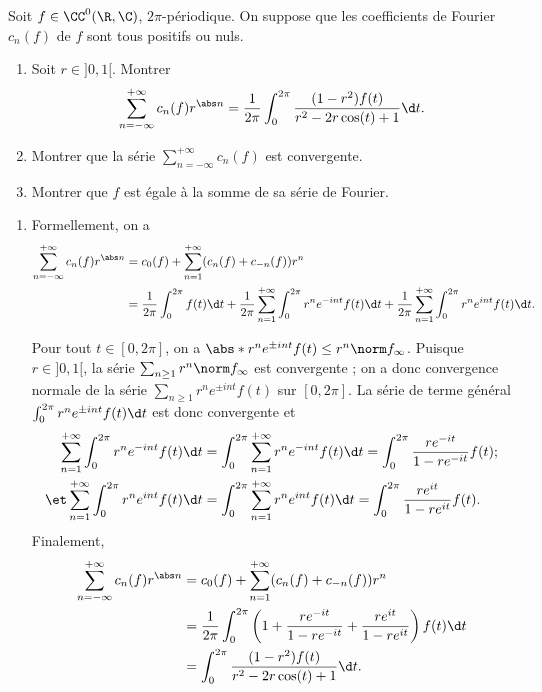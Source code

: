 \begin{enonce}
\begin{exercise}[ID={RMS121/2 E578, Mines-Ponts PSI},subtitle={},tags={}, difficulty={0}]
Soit $f\in\CC^0(\R,\C)$, $2\pi$-périodique. On suppose que les coefficients de Fourier $c_n(f)$ de $f$ sont tous positifs ou nuls.
\begin{enumerate}
\item Soit $r\in]0,1[$. Montrer
\begin{equation*}
    \sum_{n=-\infty}^{+\infty} c_n(f) r^{\abs n} 
    = \frac1{2\pi}\int_0^{2\pi} \frac{(1-r^2)f(t)}{r^2-2r\cos(t)+1}\d t.
\end{equation*}
\item Montrer que la série $\sum_{n=-\infty}^{+\infty} c_n(f)$ est convergente.
\item Montrer que $f$ est égale à la somme de sa série de Fourier.
\end{enumerate}
\end{exercise}
\begin{solution}
\begin{enumerate}
\item Formellement, on a
\begin{align*}
\sum_{n=-\infty}^{+\infty} c_n(f) r^{\abs n}
&= c_0(f) + \sum_{n=1}^{+\infty} (c_n(f)+c_{-n}(f)) r^n\\
&= \frac1{2\pi}\int_0^{2\pi} f(t)\d t
+\frac1{2\pi}\sum_{n=1}^{+\infty} \int_0^{2\pi} r^n e^{-int}f(t)\d t
+\frac1{2\pi}\sum_{n=1}^{+\infty} \int_0^{2\pi} r^n e^{int}f(t)\d t.
\end{align*}


Pour tout $t\in[0,2\pi]$, on a $\abs*{r^n e^{\pm int} f(t)}\leq r^n\norm f_\infty$.
Puisque $r\in]0,1[$, la série $\sum_{n\geq 1}  r^n\norm f_\infty$ est convergente ;
on a donc convergence normale de la série  $\sum_{n\geq 1} r^n e^{\pm int} f(t)$ sur $[0,2\pi]$.
La série de terme général $\int_0^{2\pi} r^ne^{\pm int}f(t)\d t$ est donc convergente et
\begin{align*}
    \sum_{n=1}^{+\infty} \int_0^{2\pi}r^n e^{-int}f(t)\d t 
    &= 
    \int_0^{2\pi} \sum_{n=1}^{+\infty} r^n e^{-int}f(t)\d t 
    = 
    \int_0^{2\pi}\frac{r e^{-it}}{1-re^{-it}}f(t) ;\\
\et \sum_{n=1}^{+\infty} \int_0^{2\pi}r^n e^{int}f(t)\d t 
    &= 
    \int_0^{2\pi} \sum_{n=1}^{+\infty} r^n e^{int}f(t)\d t 
    = 
    \int_0^{2\pi}\frac{r e^{it}}{1-re^{it}}f(t).
\end{align*}
Finalement,
\begin{align*}
\sum_{n=-\infty}^{+\infty} c_n(f) r^{\abs n}
&= c_0(f) + \sum_{n=1}^{+\infty} (c_n(f)+c_{-n}(f)) r^n\\
&= \frac1{2\pi}\int_0^{2\pi} 
\left( 1+ \frac{r e^{-it}}{1-re^{-it}}+\frac{r e^{it}}{1-re^{it}}\right) 
f(t) \d t\\
&= \int_0^{2\pi} \frac{(1-r^2)f(t)}{r^2-2r\cos(t)+1}\d t.
\end{align*}




\end{enumerate}
\end{solution}
\end{enonce}
